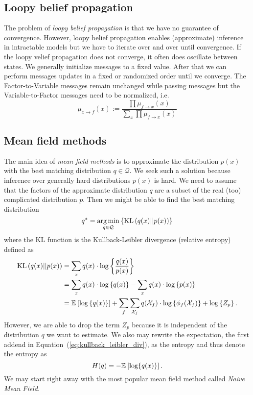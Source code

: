 \subsection{Loopy belief propagation}
The problem of \emph{loopy belief propagation} is that we have no guarantee of convergence. %
However, loopy belief propagation enables (approximate) inference in intractable models but we have to iterate over and over until convergence. %
If the loopy velief propagation does not converge, it often does oscillate between states. %
We generally initialize messages to a fixed value. %
After that we can perform messages updates in a fixed or randomized order until we converge. %
The Factor-to-Variable messages remain unchanged while passing messages but the Variable-to-Factor messages need to be normalized, i.e. %
\begin{equation}
\mu_{x\rightarrow f}(x) := \frac{\prod \mu_{f\rightarrow x}(x)}{\sum_x \prod \mu_{f\rightarrow x}(x)}
\end{equation}

%
%
%
\subsection{Mean field methods}
The main idea of \emph{mean field methods} is to approximate the distribution \ensuremath{p(x)} with the best matching distribution \ensuremath{q\in\mathcal{Q}}. %
We seek such a solution because inference over generally hard distributions \ensuremath{p(x)} is hard. %
We need to assume that the factors of the approximate distribution \ensuremath{q} are a subset of the real (too) complicated distribution \ensuremath{p}. %
Then we might be able to find the best matching distribution %
\begin{equation}
q^* = \underset{q\in\mathcal{Q}}{\arg\min}\left\{  \mathrm{KL}\left( q(x) \middle|\middle| p(x) \right)  \right\}
\label{eq:mean_field_method_goal}
\end{equation}%
where the \ensuremath{\mathrm{KL}} function is the Kullback-Leibler divergence (relative entropy) defined as %
\begin{equation}
\begin{aligned}
\KL{q(x)}{p(x)} %
&= \sum_x q(x) \cdot \log\left\{ \frac{q(x)}{p(x)} \right\} \\
&= \sum_x q(x) \cdot \log\left\{ q(x) \right\} - \sum_x q(x) \cdot \log\left\{ p(x) \right\} \\
&= \E{\log\left\{ q(x) \right\}} + \sum_f \sum_{\mathcal{X}_f} q(\mathcal{X}_f) \cdot \log\left\{ \phi_f(\mathcal{X}_f) \right\} + \log\left\{ Z_p \right\}.
\end{aligned}
\label{eq:kullback_leibler_div}
\end{equation}%
However, we are able to drop the term \ensuremath{Z_p} because it is independent of the distribution \ensuremath{q} we want to estimate. %
We also may rewrite the expectation, the first addend in Equation~(\ref{eq:kullback_leibler_div}), as the entropy and thus denote the entropy as %
\begin{equation}
H(q) = -\mathbb{E}_{}\left[ \log\{q(x)\} \right].
\label{eq:entropy}
\end{equation}
We may start right away with the most popular mean field method called \emph{Naive Mean Field}. %
